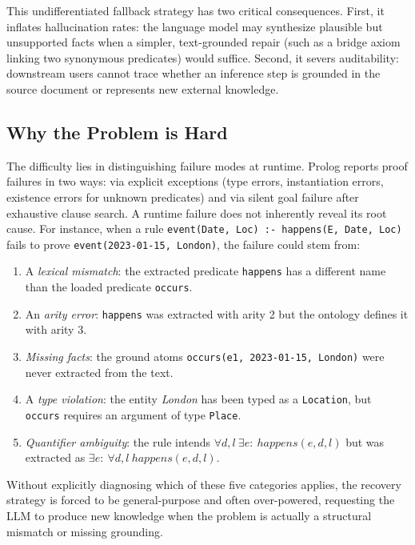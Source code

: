 \documentclass[11pt,letterpaper]{article}
\begin{document}
This undifferentiated fallback strategy has two critical consequences. First, it inflates hallucination rates: the language model may synthesize plausible but unsupported facts when a simpler, text-grounded repair (such as a bridge axiom linking two synonymous predicates) would suffice. Second, it severs auditability: downstream users cannot trace whether an inference step is grounded in the source document or represents new external knowledge.

\subsection{Why the Problem is Hard}

The difficulty lies in distinguishing failure modes at runtime. Prolog reports proof failures in two ways: via explicit exceptions (type errors, instantiation errors, existence errors for unknown predicates) and via silent goal failure after exhaustive clause search. A runtime failure does not inherently reveal its root cause. For instance, when a rule \texttt{event(Date, Loc) :- happens(E, Date, Loc)} fails to prove \texttt{event(2023-01-15, London)}, the failure could stem from:

\begin{enumerate}
\item A \emph{lexical mismatch}: the extracted predicate \texttt{happens} has a different name than the loaded predicate \texttt{occurs}.
\item An \emph{arity error}: \texttt{happens} was extracted with arity 2 but the ontology defines it with arity 3.
\item \emph{Missing facts}: the ground atoms \texttt{occurs(e1, 2023-01-15, London)} were never extracted from the text.
\item A \emph{type violation}: the entity \textit{London} has been typed as a \texttt{Location}, but \texttt{occurs} requires an argument of type \texttt{Place}.
\item \emph{Quantifier ambiguity}: the rule intends $\forall d, l\ \exists e{:}\ \mathit{happens}(e, d, l)$ but was extracted as $\exists e{:}\ \forall d, l\ \mathit{happens}(e, d, l)$.
\end{enumerate}

Without explicitly diagnosing which of these five categories applies, the recovery strategy is forced to be general-purpose and often over-powered, requesting the LLM to produce new knowledge when the problem is actually a structural mismatch or missing grounding.
\end{document}
